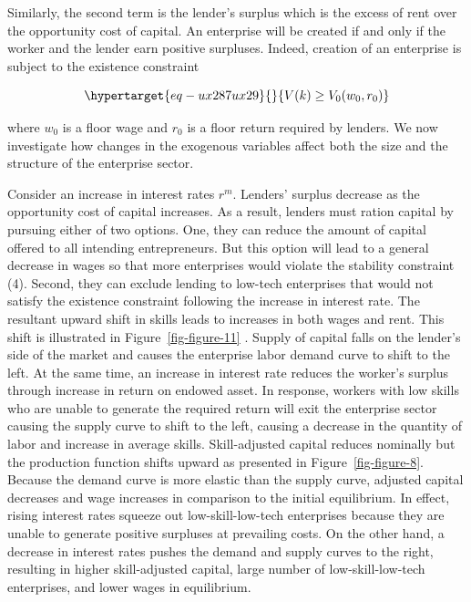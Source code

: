 \documentclass[
  a4paper,
  DIV=11,
  numbers=noendperiod]{scrartcl}
\begin{document}
Similarly, the second term is the lender's surplus which is the excess
of rent over the opportunity cost of capital. An enterprise will be
created if and only if the worker and the lender earn positive
surpluses. Indeed, creation of an enterprise is subject to the existence
constraint

\begin{equation}\protect\hypertarget{eq-ux287ux29}{}{
V(k) \ge V_0(w_0,r_0)
}\label{eq-(7)}\end{equation}

where \(w_0\) is a floor wage and \(r_0\) is a floor return required by
lenders. We now investigate how changes in the exogenous variables
affect both the size and the structure of the enterprise sector.

Consider an increase in interest rates \(r^m\). Lenders' surplus
decrease as the opportunity cost of capital increases. As a result,
lenders must ration capital by pursuing either of two options. One, they
can reduce the amount of capital offered to all intending entrepreneurs.
But this option will lead to a general decrease in wages so that more
enterprises would violate the stability constraint (4). Second, they can
exclude lending to low-tech enterprises that would not satisfy the
existence constraint following the increase in interest rate. The
resultant upward shift in skills leads to increases in both wages and
rent. This shift is illustrated in Figure~\ref{fig-figure-11} . Supply
of capital falls on the lender's side of the market and causes the
enterprise labor demand curve to shift to the left. At the same time, an
increase in interest rate reduces the worker's surplus through increase
in return on endowed asset. In response, workers with low skills who are
unable to generate the required return will exit the enterprise sector
causing the supply curve to shift to the left, causing a decrease in the
quantity of labor and increase in average skills. Skill-adjusted capital
reduces nominally but the production function shifts upward as presented
in Figure~\ref{fig-figure-8}. Because the demand curve is more elastic
than the supply curve, adjusted capital decreases and wage increases in
comparison to the initial equilibrium. In effect, rising interest rates
squeeze out low-skill-low-tech enterprises because they are unable to
generate positive surpluses at prevailing costs. On the other hand, a
decrease in interest rates pushes the demand and supply curves to the
right, resulting in higher skill-adjusted capital, large number of
low-skill-low-tech enterprises, and lower wages in equilibrium.
\end{document}
